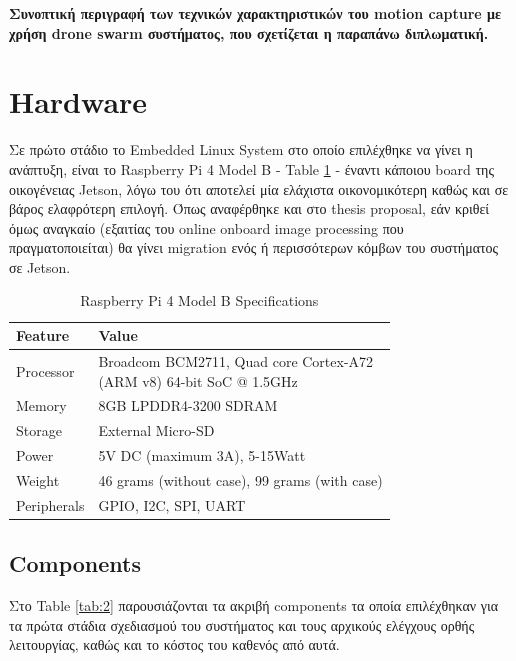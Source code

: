\textbf{Συνοπτική περιγραφή των τεχνικών χαρα\-κτη\-ρι\-στικών του motion capture με χρήση drone swarm συστήματος, που σχετίζεται η παραπάνω διπλωματική.}
  

\section{Hardware}
Σε πρώτο στάδιο το Embedded Linux System στο οποίο επιλέχθηκε να γίνει η ανάπτυξη, είναι το Raspberry Pi 4 Model B - Table \ref{tab:1} - έναντι κάποιου board της οικογένειας Jetson, λόγω του ότι αποτελεί μία ελάχιστα οικονομικότερη καθώς και σε βάρος ελαφρότερη επιλογή. Όπως αναφέρθηκε και στο thesis proposal, εάν κριθεί όμως αναγκαίο (εξαιτίας του online onboard image processing που πραγματοποιείται) θα γίνει migration ενός ή περισσότερων κόμβων του συστήματος σε Jetson. 

\begin{table}[H]
  \caption[]{Raspberry Pi 4 Model B Specifications}
  \label{tab:1}
  \centering
  \begin{tabular}{ll}
      \hline
      \textbf{Feature} & \textbf{Value}  \\
      \hline
          Processor & \Centerstack{Broadcom BCM2711, Quad core Cortex-A72 \\(ARM v8) 64-bit SoC @ 1.5GHz }\\
          Memory & 8GB LPDDR4-3200 SDRAM \\
          Storage & External Micro-SD \\  
          Power & 5V DC (maximum 3A), 5-15Watt \\
          Weight & 46 grams (without case), 99 grams (with case) \\
          Peripherals & GPIO, I2C, SPI, UART \\
          \hline
  \end{tabular}
\end{table}

\subsection{Components}
Στο Table \ref{tab:2} παρουσιάζονται τα ακριβή components τα οποία επιλέχθηκαν για τα πρώτα στάδια σχεδιασμού του συστήματος και τους αρχικούς ελέγχους ορθής λειτουργίας, καθώς και το κόστος του καθενός από αυτά.  

